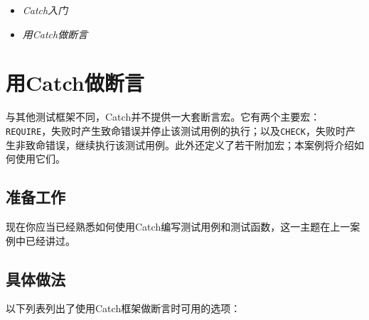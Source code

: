 \begin{itemize}
\item \textit{Catch入门}



\item \textit{用Catch做断言}

\end{itemize}



\section{用Catch做断言}



与其他测试框架不同，Catch并不提供一大套断言宏。它有两个主要宏：\texttt{REQUIRE}，失败时产生致命错误并停止该测试用例的执行；以及\texttt{CHECK}，失败时产生非致命错误，继续执行该测试用例。此外还定义了若干附加宏；本案例将介绍如何使用它们。



\subsection{准备工作}



现在你应当已经熟悉如何使用Catch编写测试用例和测试函数，这一主题在上一案例中已经讲过。



\subsection{具体做法}



以下列表列出了使用Catch框架做断言时可用的选项：



